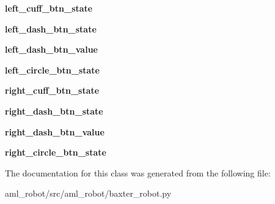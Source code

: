 \begin{DoxyCompactItemize}
\item 
\hypertarget{classaml__robot_1_1baxter__robot_1_1_baxter_button_status_a3d147c0e2ab38474d2cb2d2cb358e9c6}{{\bfseries left\-\_\-cuff\-\_\-btn\-\_\-state}}\label{classaml__robot_1_1baxter__robot_1_1_baxter_button_status_a3d147c0e2ab38474d2cb2d2cb358e9c6}

\item 
\hypertarget{classaml__robot_1_1baxter__robot_1_1_baxter_button_status_a9858defbdfd1953111bc032a679dfbf6}{{\bfseries left\-\_\-dash\-\_\-btn\-\_\-state}}\label{classaml__robot_1_1baxter__robot_1_1_baxter_button_status_a9858defbdfd1953111bc032a679dfbf6}

\item 
\hypertarget{classaml__robot_1_1baxter__robot_1_1_baxter_button_status_ac4505635cb0c3096d50145a00aa996e1}{{\bfseries left\-\_\-dash\-\_\-btn\-\_\-value}}\label{classaml__robot_1_1baxter__robot_1_1_baxter_button_status_ac4505635cb0c3096d50145a00aa996e1}

\item 
\hypertarget{classaml__robot_1_1baxter__robot_1_1_baxter_button_status_a2cf8425649007e50335a7eab640138bd}{{\bfseries left\-\_\-circle\-\_\-btn\-\_\-state}}\label{classaml__robot_1_1baxter__robot_1_1_baxter_button_status_a2cf8425649007e50335a7eab640138bd}

\item 
\hypertarget{classaml__robot_1_1baxter__robot_1_1_baxter_button_status_a0b2de8e8474d9e9217024692b425a0b4}{{\bfseries right\-\_\-cuff\-\_\-btn\-\_\-state}}\label{classaml__robot_1_1baxter__robot_1_1_baxter_button_status_a0b2de8e8474d9e9217024692b425a0b4}

\item 
\hypertarget{classaml__robot_1_1baxter__robot_1_1_baxter_button_status_a99abdcffd19c44a10cb1f4a875adbb2d}{{\bfseries right\-\_\-dash\-\_\-btn\-\_\-state}}\label{classaml__robot_1_1baxter__robot_1_1_baxter_button_status_a99abdcffd19c44a10cb1f4a875adbb2d}

\item 
\hypertarget{classaml__robot_1_1baxter__robot_1_1_baxter_button_status_a990924b4c4d0b7f05b7fc909b3b7cc2f}{{\bfseries right\-\_\-dash\-\_\-btn\-\_\-value}}\label{classaml__robot_1_1baxter__robot_1_1_baxter_button_status_a990924b4c4d0b7f05b7fc909b3b7cc2f}

\item 
\hypertarget{classaml__robot_1_1baxter__robot_1_1_baxter_button_status_a6b266aa0af869f160bd2654e6fde6756}{{\bfseries right\-\_\-circle\-\_\-btn\-\_\-state}}\label{classaml__robot_1_1baxter__robot_1_1_baxter_button_status_a6b266aa0af869f160bd2654e6fde6756}

\end{DoxyCompactItemize}


The documentation for this class was generated from the following file\-:\begin{DoxyCompactItemize}
\item 
aml\-\_\-robot/src/aml\-\_\-robot/baxter\-\_\-robot.\-py\end{DoxyCompactItemize}
